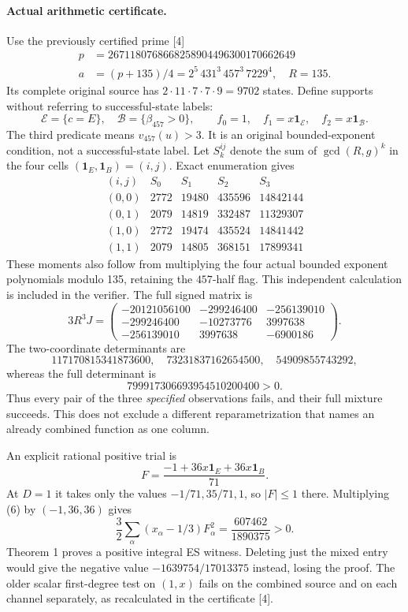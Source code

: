 \documentclass[10pt,a4paper]{article}
\begin{document}
\paragraph{Actual arithmetic certificate.}
Use the previously certified prime [4]
\[
\begin{split}
 p&=2671180768668258904496300170662649\\
 a&=(p+135)/4=2^5\,431^3\,457^3\,7229^4,\quad R=135.
\end{split}
\]
Its complete original source has $2\cdot11\cdot7\cdot7\cdot9=9702$ states.
Define supports without referring to successful-state labels:
\[
 \mathcal E=\{c=E\},\quad \mathcal B=\{\beta_{457}>0\},\qquad
 f_0=1,\quad f_1=x\mathbf1_{\mathcal E},\quad f_2=x\mathbf1_{\mathcal B}.
 \tag{4}
\]
The third predicate means $v_{457}(u)>3$. It is an original bounded-exponent
condition, not a successful-state label.
Let $S_k^{ij}$ denote the sum of $\gcd(R,g)^k$ in the four cells
$(\mathbf1_E,\mathbf1_B)=(i,j)$. Exact enumeration gives
\[
\begin{array}{c|rrrr}
(i,j)&S_0&S_1&S_2&S_3\\\hline
(0,0)&2772&19480&435596&14842144\\
(0,1)&2079&14819&332487&11329307\\
(1,0)&2772&19474&435524&14841442\\
(1,1)&2079&14805&368151&17899341
\end{array}\tag{5}
\]
These moments also follow from multiplying the four actual bounded exponent
polynomials modulo 135, retaining the $457$-half flag. This independent
calculation is included in the verifier.
The full signed matrix is
\[
 \boxed{3R^3J=
 \begin{pmatrix}
 -20121056100&-299246400&-256139010\\
 -299246400&-10273776&3997638\\
 -256139010&3997638&-6900186
 \end{pmatrix}.}\tag{6}
\]
The two-coordinate determinants are
\[
 117170815341873600,\quad73231837162654500,\quad54909855743292,
\]
whereas the full determinant is
\[
 799917306693954510200400>0.\tag{7}
\]
Thus every pair of the three \emph{specified} observations fails, and their
full mixture succeeds. This does not exclude a different reparametrization
that names an already combined function as one column.

An explicit rational positive trial is
\[
 F=\frac{-1+36x\mathbf1_E+36x\mathbf1_B}{71}.
\]
At $D=1$ it takes only the values $-1/71,35/71,1$, so $|F|\le1$ there.
Multiplying (6) by $(-1,36,36)$ gives
\[
 \boxed{\frac32\sum_\alpha(x_\alpha-1/3)F_\alpha^2
       =\frac{607462}{1890375}>0.}\tag{8}
\]
Theorem 1 proves a positive integral ES witness. Deleting just the mixed
entry would give the negative value $-1639754/17013375$ instead, losing the proof.
The older scalar first-degree test on $(1,x)$ fails on the combined source
and on each channel separately, as recalculated in the certificate [4].
\end{document}
